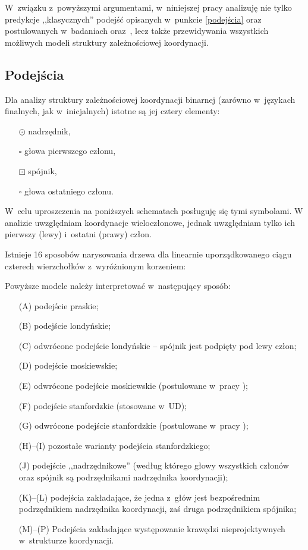 W~związku z~powyższymi argumentami, w~niniejszej pracy analizuję nie tylko predykcje ,,klasycznych'' podejść opisanych w~punkcie \ref{podejścia} oraz postulowanych w~badaniach \cite{kanayama2018coordinate} oraz~\cite{choi2011statistical}, lecz także przewidywania wszystkich możliwych modeli struktury zależnościowej koordynacji.

\subsection{Podejścia} \label{wszystkie-podejścia}

Dla analizy struktury zależnościowej koordynacji binarnej (zarówno w~językach finalnych, jak w~inicjalnych) istotne są jej cztery elementy: 
\begin{itemize}
\item[$\odot$] nadrzędnik, 
\item[$\square$] głowa pierwszego członu,
\item[$\boxdot$] spójnik, 
\item[$\square$] głowa ostatniego członu. 
\end{itemize}
W~celu uproszczenia na poniższych schematach posługuję się tymi symbolami. W analizie uwzględniam koordynacje wieloczłonowe, jednak uwzględniam tylko ich pierwszy (lewy) i~ostatni (prawy) człon.

Istnieje 16 sposobów narysowania drzewa dla linearnie uporządkowanego ciągu czterech wierzchołków z~wyróżnionym korzeniem:



Powyższe modele należy interpretować w~następujący sposób:
\begin{enumerate}
\item[(A)] podejście praskie;
\item[(B)] podejście londyńskie;
\item[(C)] odwrócone podejście londyńskie -- spójnik jest podpięty pod lewy człon;
\item[(D)] podejście moskiewskie;
\item[(E)] odwrócone podejście moskiewskie (postulowane w~pracy \citealp{choi2011statistical});
\item[(F)] podejście stanfordzkie (stosowane w~UD);
\item[(G)] odwrócone podejście stanfordzkie (postulowane w~pracy \citealp{kanayama2018coordinate});
\item[(H)--(I)] pozostałe warianty podejścia stanfordzkiego;
\item[(J)] podejście ,,nadrzędnikowe'' (według którego głowy wszystkich członów oraz spójnik są podrzędnikami nadrzędnika koordynacji);
\item[(K)--(L)] podejścia zakładające, że jedna z~głów jest bezpośrednim podrzędnikiem nadrzędnika koordynacji, zaś druga podrzędnikiem spójnika;
\item[(M)--(P)]  Podejścia zakładające występowanie krawędzi nieprojektywnych w~strukturze koordynacji.
\end{enumerate}

